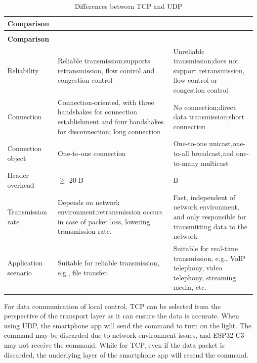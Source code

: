 \documentclass[a4paper,12pt,openany]{book}
\renewcommand{\arraystretch}{1}
\begin{document}
{\renewcommand{\arraystretch}{1.2}
\begin{longtable}{|>{\Centering}m{6em}|>{\RaggedRight}m{16em}|>{\RaggedRight}m{16em}|}
    \caption{Differences between TCP and UDP \label{8.3}} \\
        
    \hline
    \rowcolor{LightBlue} \textbf{Comparison}&\multicolumn{1}{c|}{\textbf{TCP}}&\multicolumn{1}{c|}{\textbf{UDP}}\\
    \hline
    \endfirsthead

    \multicolumn{3}{r}{Continuation of Table \ref{8.3}}\\
    \hline
    \rowcolor{LightBlue} \textbf{Comparison}&\multicolumn{1}{c|}{\textbf{TCP}}&\multicolumn{1}{c|}{\textbf{UDP}}\\
    \hline
    \endhead
        
    Reliability&Reliable transmission;\newline supports retransmission, flow control and congestion control&Unreliable transmission;\newline does not support retransmission, flow control or congestion control\\
    \hline
    Connection&Connection-oriented, with three handshakes for connection establishment and four handshakes for disconnection; long connection&No connection;\newline direct data transmission;\newline short connection\\
    \hline
    Connection object&One-to-one connection&One-to-one unicast,\newline one-to-all broadcast,\newline and one-to-many multicast\\
    \hline
    Header overhead&$\geq$ 20 B&8 B\\
    \hline
    Transmission rate&Depends on network environment;\newline retransmission occurs in case of packet loss, lowering transmission rate.&Fast, independent of network environment, and only responsible for transmitting data to the network\\
    \hline
    Application scenario&Suitable for reliable transmission, e.g., file transfer.&Suitable for real-time transmission, e.g., VoIP telephony, video telephony, streaming media, etc.\\
    \hline
\end{longtable}
}

For data communication of local control, TCP can be selected from the perspective of the transport layer as it can ensure the data is accurate. When using UDP, the smartphone app will send the command to turn on the light. The command may be discarded due to network environment issues, and ESP32-C3 may not receive the command. While for TCP, even if the data packet is discarded, the underlying layer of the smartphone app will resend the command.
\end{document}
